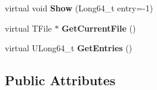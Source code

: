 \begin{DoxyCompactItemize}
\item 
\hypertarget{classwcsimT_af7c99912db46c5670d5c659ee3df9894}{virtual void {\bfseries Show} (Long64\-\_\-t entry=-\/1)}\label{classwcsimT_af7c99912db46c5670d5c659ee3df9894}

\item 
\hypertarget{classwcsimT_a5d8d59c3f88fa55a3160db306d53749d}{virtual T\-File $\ast$ {\bfseries Get\-Current\-File} ()}\label{classwcsimT_a5d8d59c3f88fa55a3160db306d53749d}

\item 
\hypertarget{classwcsimT_acf3719002e2e477702b4fd0436cad43c}{virtual U\-Long64\-\_\-t {\bfseries Get\-Entries} ()}\label{classwcsimT_acf3719002e2e477702b4fd0436cad43c}

\end{DoxyCompactItemize}
\subsection*{Public Attributes}
